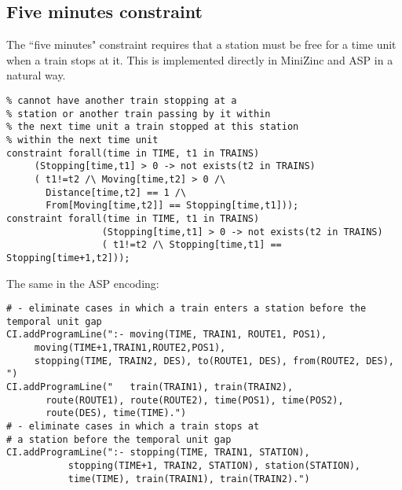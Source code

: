 \documentclass[11pt]{article}
\begin{document}
\subsection{Five minutes constraint}
The ``five minutes" constraint requires that a station must be 
free for a time unit when a train stops at it. This is implemented
directly in MiniZinc and ASP in a natural way.
\begin{verbatim}
% cannot have another train stopping at a 
% station or another train passing by it within 
% the next time unit a train stopped at this station
% within the next time unit 
constraint forall(time in TIME, t1 in TRAINS)
     (Stopping[time,t1] > 0 -> not exists(t2 in TRAINS)
     ( t1!=t2 /\ Moving[time,t2] > 0 /\ 
       Distance[time,t2] == 1 /\ 
       From[Moving[time,t2]] == Stopping[time,t1]));
constraint forall(time in TIME, t1 in TRAINS)
                 (Stopping[time,t1] > 0 -> not exists(t2 in TRAINS)
                 ( t1!=t2 /\ Stopping[time,t1] == Stopping[time+1,t2]));
\end{verbatim}
The same in the ASP encoding:
\begin{verbatim}
# - eliminate cases in which a train enters a station before the temporal unit gap
CI.addProgramLine(":- moving(TIME, TRAIN1, ROUTE1, POS1),
     moving(TIME+1,TRAIN1,ROUTE2,POS1),
     stopping(TIME, TRAIN2, DES), to(ROUTE1, DES), from(ROUTE2, DES), ")
CI.addProgramLine("   train(TRAIN1), train(TRAIN2), 
       route(ROUTE1), route(ROUTE2), time(POS1), time(POS2),
       route(DES), time(TIME).") 
# - eliminate cases in which a train stops at 
# a station before the temporal unit gap
CI.addProgramLine(":- stopping(TIME, TRAIN1, STATION), 
           stopping(TIME+1, TRAIN2, STATION), station(STATION), 
           time(TIME), train(TRAIN1), train(TRAIN2).")
\end{verbatim}
\end{document}
